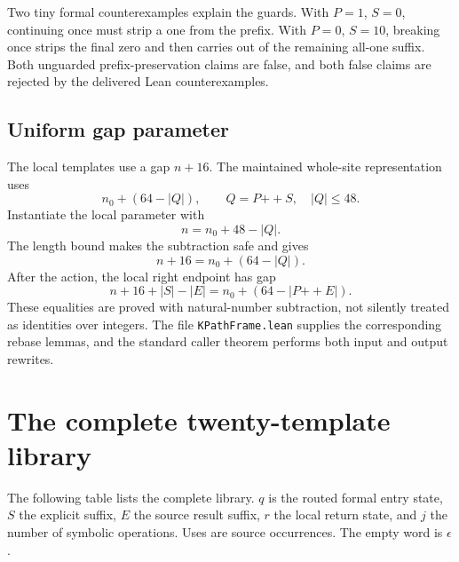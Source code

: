 \documentclass[11pt]{article}
\theoremstyle{definition}\newtheorem{definition}[theorem]{Definition}
\theoremstyle{remark}\newtheorem{remark}[theorem]{Remark}
\newcommand{\cat}{\mathbin{+\!+}}
\newcommand{\code}[1]{\nolinkurl{#1}}
\begin{document}
Two tiny formal counterexamples explain the guards. With $P=1$, $S=0$, continuing once must strip a one from the prefix. With $P=0$, $S=10$, breaking once strips the final zero and then carries out of the remaining all-one suffix. Both unguarded prefix-preservation claims are false, and both false claims are rejected by the delivered Lean counterexamples.

\subsection{Uniform gap parameter}

The local templates use a gap $n+16$. The maintained whole-site representation uses
\[
 n_0+(64-|Q|),\qquad Q=P\cat S,\quad |Q|\leq48.
\]
Instantiate the local parameter with
\[
 n=n_0+48-|Q|.
\]
The length bound makes the subtraction safe and gives
\[
 n+16=n_0+(64-|Q|).
\]
After the action, the local right endpoint has gap
\[
 n+16+|S|-|E|=n_0+(64-|P\cat E|).
\]
These equalities are proved with natural-number subtraction, not silently treated as identities over integers. The file \code{KPathFrame.lean} supplies the corresponding rebase lemmas, and the standard caller theorem performs both input and output rewrites.

\clearpage
\section{The complete twenty-template library}

The following table lists the complete library. $q$ is the routed formal entry state, $S$ the explicit suffix, $E$ the source result suffix, $r$ the local return state, and $j$ the number of symbolic operations. Uses are source occurrences. The empty word is $\epsilon$.
\end{document}
